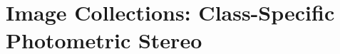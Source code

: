 \chapter{Image Collections: Class-Specific Photometric Stereo}\label{ch:imag_coll}
\minitoc{}

\stopcontents[chapters]

